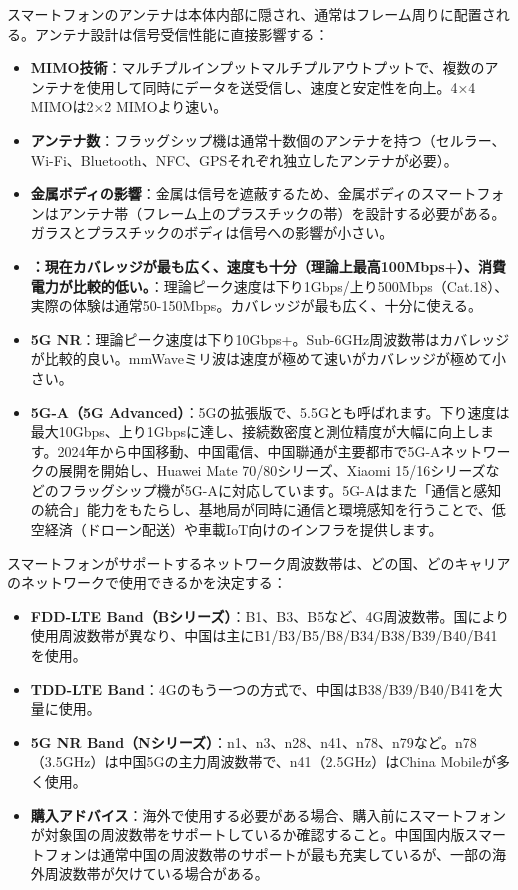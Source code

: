 スマートフォンのアンテナは本体内部に隠され、通常はフレーム周りに配置される。アンテナ設計は信号受信性能に直接影響する：

\begin{itemize}
  \item \textbf{MIMO技術}：マルチプルインプットマルチプルアウトプットで、複数のアンテナを使用して同時にデータを送受信し、速度と安定性を向上。4×4 MIMOは2×2 MIMOより速い。
  \item \textbf{アンテナ数}：フラッグシップ機は通常十数個のアンテナを持つ（セルラー、Wi-Fi、Bluetooth、NFC、GPSそれぞれ独立したアンテナが必要）。
  \item \textbf{金属ボディの影響}：金属は信号を遮蔽するため、金属ボディのスマートフォンはアンテナ帯（フレーム上のプラスチックの帯）を設計する必要がある。ガラスとプラスチックのボディは信号への影響が小さい。
\end{itemize}


\begin{itemize}
  \item \textbf{：現在カバレッジが最も広く、速度も十分（理論上最高100Mbps+）、消費電力が比較的低い。}：理論ピーク速度は下り1Gbps/上り500Mbps（Cat.18）、実際の体験は通常50-150Mbps。カバレッジが最も広く、十分に使える。
  \item \textbf{5G NR}：理論ピーク速度は下り10Gbps+。Sub-6GHz周波数帯はカバレッジが比較的良い。mmWaveミリ波は速度が極めて速いがカバレッジが極めて小さい。
  \item \textbf{5G-A（5G Advanced）}：5Gの拡張版で、5.5Gとも呼ばれます。下り速度は最大10Gbps、上り1Gbpsに達し、接続数密度と測位精度が大幅に向上します。2024年から中国移動、中国電信、中国聯通が主要都市で5G-Aネットワークの展開を開始し、Huawei Mate 70/80シリーズ、Xiaomi 15/16シリーズなどのフラッグシップ機が5G-Aに対応しています。5G-Aはまた「通信と感知の統合」能力をもたらし、基地局が同時に通信と環境感知を行うことで、低空経済（ドローン配送）や車載IoT向けのインフラを提供します。
\end{itemize}


スマートフォンがサポートするネットワーク周波数帯は、どの国、どのキャリアのネットワークで使用できるかを決定する：

\begin{itemize}
  \item \textbf{FDD-LTE Band（Bシリーズ）}：B1、B3、B5など、4G周波数帯。国により使用周波数帯が異なり、中国は主にB1/B3/B5/B8/B34/B38/B39/B40/B41を使用。
  \item \textbf{TDD-LTE Band}：4Gのもう一つの方式で、中国はB38/B39/B40/B41を大量に使用。
  \item \textbf{5G NR Band（Nシリーズ）}：n1、n3、n28、n41、n78、n79など。n78（3.5GHz）は中国5Gの主力周波数帯で、n41（2.5GHz）はChina Mobileが多く使用。
  \item \textbf{購入アドバイス}：海外で使用する必要がある場合、購入前にスマートフォンが対象国の周波数帯をサポートしているか確認すること。中国国内版スマートフォンは通常中国の周波数帯のサポートが最も充実しているが、一部の海外周波数帯が欠けている場合がある。
\end{itemize}

